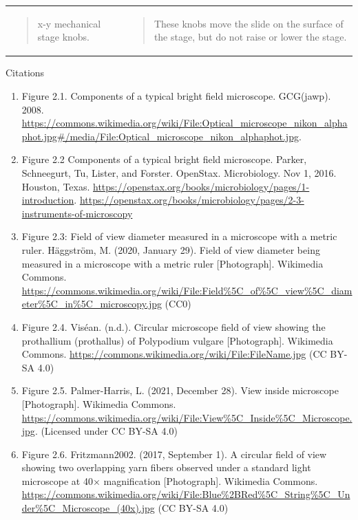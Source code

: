 \documentclass[
  letterpaper,
  DIV=11,
  numbers=noendperiod]{scrreprt}
\begin{document}
{\begin{longtable}[]{@{}
  >{\centering\arraybackslash}p{}
  >{\centering\arraybackslash}p{}@{}}
\begin{minipage}[t]{\linewidth}\centering
\begin{quote}
x-y mechanical stage knobs.
\end{quote}
\end{minipage} & \begin{minipage}[t]{\linewidth}\centering
\begin{quote}
These knobs move the slide on the surface of the stage, but do not raise
or lower the stage.
\end{quote}
\end{minipage} \\
\end{longtable}
}

Citations

\begin{enumerate}
\def\labelenumi{\arabic{enumi}.}
\item
  Figure 2.1. Components of a typical bright field microscope.
  GCG(jawp). 2008.
  \url{https://commons.wikimedia.org/wiki/File:Optical_microscope_nikon_alphaphot.jpg\#/media/File:Optical_microscope_nikon_alphaphot.jpg}.
\item
  Figure 2.2 Components of a typical bright field microscope. Parker,
  Schneegurt, Tu, Lister, and Forster. OpenStax. Microbiology. Nov 1,
  2016. Houston, Texas.
  \url{https://openstax.org/books/microbiology/pages/1-introduction}.
  \url{https://openstax.org/books/microbiology/pages/2-3-instruments-of-microscopy}
\item
  Figure 2.3: Field of view diameter measured in a microscope with a
  metric ruler. Häggström, M. (2020, January 29). Field of view diameter
  being measured in a microscope with a metric ruler {[}Photograph{]}.
  Wikimedia Commons.
  \url{https://commons.wikimedia.org/wiki/File:Field\%5C_of\%5C_view\%5C_diameter\%5C_in\%5C_microscopy.jpg}
  (CC0)
\item
  Figure 2.4. Viséan. (n.d.). Circular microscope field of view showing
  the prothallium (prothallus) of Polypodium vulgare {[}Photograph{]}.
  Wikimedia Commons.
  \url{https://commons.wikimedia.org/wiki/File:FileName.jpg} (CC BY-SA
  4.0)
\item
  Figure 2.5. Palmer-Harris, L. (2021, December 28). View inside
  microscope {[}Photograph{]}. Wikimedia Commons.
  \url{https://commons.wikimedia.org/wiki/File:View\%5C_Inside\%5C_Microscope.jpg}.
  (Licensed under CC BY-SA 4.0)
\item
  Figure 2.6. Fritzmann2002. (2017, September 1). A circular field of
  view showing two overlapping yarn fibers observed under a standard
  light microscope at 40× magnification {[}Photograph{]}. Wikimedia
  Commons.
  \url{https://commons.wikimedia.org/wiki/File:Blue\%2BRed\%5C_String\%5C_Under\%5C_Microscope_(40x).jpg}
  (CC BY-SA 4.0)
\end{enumerate}
\end{document}
